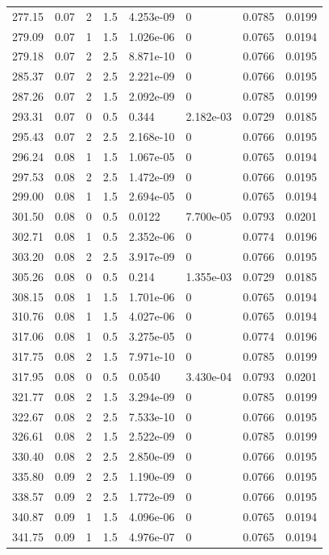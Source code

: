 \documentclass[preview]{standalone}
\begin{document}
{{\begin{tabular}{L{1.2cm}C{1.2cm} C{0.3cm}C{0.5cm} C{1.4cm}C{1.4cm} C{1.4cm}C{1.4cm}}
  277.15  &  0.07  & 2     & 1.5 &  4.253e-09  & 0  & 0.0785 &  0.0199   \\ 
  279.09  &  0.07  & 1     & 1.5 &  1.026e-06  & 0  & 0.0765 &  0.0194   \\ 
  279.18  &  0.07  & 2     & 2.5 &  8.871e-10  & 0  & 0.0766 &  0.0195   \\ 
  285.37  &  0.07  & 2     & 2.5 &  2.221e-09  & 0  & 0.0766 &  0.0195   \\ 
  287.26  &  0.07  & 2     & 1.5 &  2.092e-09  & 0  & 0.0785 &  0.0199   \\ 
  293.31  &  0.07  & 0     & 0.5 &  0.344  & 2.182e-03  & 0.0729 &  0.0185   \\ 
  295.43  &  0.07  & 2     & 2.5 &  2.168e-10  & 0  & 0.0766 &  0.0195   \\ 
  296.24  &  0.08  & 1     & 1.5 &  1.067e-05  & 0  & 0.0765 &  0.0194   \\ 
  297.53  &  0.08  & 2     & 2.5 &  1.472e-09  & 0  & 0.0766 &  0.0195   \\ 
  299.00  &  0.08  & 1     & 1.5 &  2.694e-05  & 0  & 0.0765 &  0.0194   \\ 
  301.50  &  0.08  & 0     & 0.5 &  0.0122  & 7.700e-05  & 0.0793 &  0.0201   \\ 
  302.71  &  0.08  & 1     & 0.5 &  2.352e-06  & 0  & 0.0774 &  0.0196   \\ 
  303.20  &  0.08  & 2     & 2.5 &  3.917e-09  & 0  & 0.0766 &  0.0195   \\ 
  305.26  &  0.08  & 0     & 0.5 &  0.214  & 1.355e-03  & 0.0729 &  0.0185   \\ 
  308.15  &  0.08  & 1     & 1.5 &  1.701e-06  & 0  & 0.0765 &  0.0194   \\ 
  310.76  &  0.08  & 1     & 1.5 &  4.027e-06  & 0  & 0.0765 &  0.0194   \\ 
  317.06  &  0.08  & 1     & 0.5 &  3.275e-05  & 0  & 0.0774 &  0.0196   \\ 
  317.75  &  0.08  & 2     & 1.5 &  7.971e-10  & 0  & 0.0785 &  0.0199   \\ 
  317.95  &  0.08  & 0     & 0.5 &  0.0540  & 3.430e-04  & 0.0793 &  0.0201   \\ 
  321.77  &  0.08  & 2     & 1.5 &  3.294e-09  & 0  & 0.0785 &  0.0199   \\ 
  322.67  &  0.08  & 2     & 2.5 &  7.533e-10  & 0  & 0.0766 &  0.0195   \\ 
  326.61  &  0.08  & 2     & 1.5 &  2.522e-09  & 0  & 0.0785 &  0.0199   \\ 
  330.40  &  0.08  & 2     & 2.5 &  2.850e-09  & 0  & 0.0766 &  0.0195   \\ 
  335.80  &  0.09  & 2     & 2.5 &  1.190e-09  & 0  & 0.0766 &  0.0195   \\ 
  338.57  &  0.09  & 2     & 2.5 &  1.772e-09  & 0  & 0.0766 &  0.0195   \\ 
  340.87  &  0.09  & 1     & 1.5 &  4.096e-06  & 0  & 0.0765 &  0.0194   \\ 
  341.75  &  0.09  & 1     & 1.5 &  4.976e-07  & 0  & 0.0765 &  0.0194   \\ 
\hline 
\end{tabular} 

}}
\end{document}
